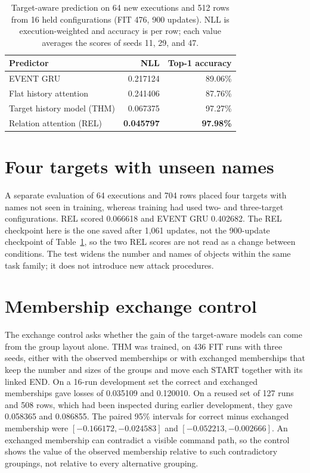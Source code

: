 \begin{table}[htbp]
\centering
\caption[Target-aware prediction on 64 new executions]{Target-aware prediction on 64 new executions and 512 rows from
16 held configurations (FIT 476, 900 updates). NLL is execution-weighted
and accuracy is per row; each value averages the scores of seeds 11, 29,
and 47.}
\label{tab:relations}
\begin{tabular}{@{}lrr@{}}
\toprule
Predictor & NLL & Top-1 accuracy \\
\midrule
EVENT GRU & 0.217124 & 89.06\% \\
Flat history attention & 0.241406 & 87.76\% \\
Target history model (THM) & 0.067375 & 97.27\% \\
Relation attention (REL) & \textbf{0.045797} & \textbf{97.98\%} \\
\bottomrule
\end{tabular}
\end{table}

\section{Four targets with unseen names}
\label{sec:app-four}

A separate evaluation of 64 executions and 704 rows placed four targets
with names not seen in training, whereas training had used two- and
three-target configurations. REL scored 0.066618 and EVENT GRU 0.402682.
The REL checkpoint here is the one saved after 1,061 updates, not the
900-update checkpoint of Table~\ref{tab:relations}, so the two REL
scores are not read as a change between conditions. The test widens the
number and names of objects within the same task family; it does not
introduce new attack procedures.

\section{Membership exchange control}
\label{sec:app-exchange}

The exchange control asks whether the gain of the target-aware models
can come from the group layout alone. THM was trained, on 436 FIT runs
with three seeds, either with the observed memberships or with exchanged
memberships that keep the number and sizes of the groups and move each
START together with its linked END. On a 16-run development set the
correct and exchanged memberships gave losses of 0.035109 and 0.120010.
On a reused set of 127 runs and 508 rows, which had been inspected
during earlier development, they gave 0.058365 and 0.086855. The paired
95\% intervals for correct minus exchanged membership were
$[-0.166172,-0.024583]$ and $[-0.052213,-0.002666]$. An exchanged
membership can contradict a visible command path, so the control shows
the value of the observed membership relative to such contradictory
groupings, not relative to every alternative grouping.

